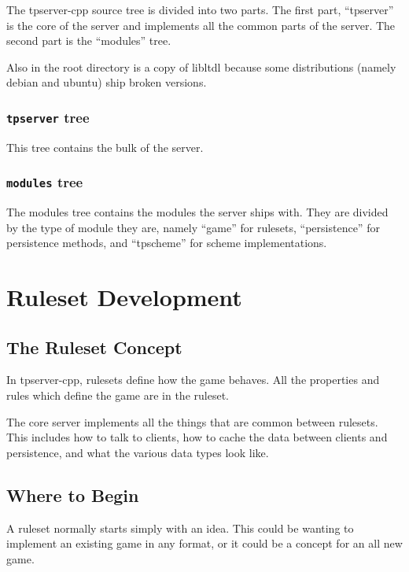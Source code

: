 \documentclass[a4paper,11pt]{report}
\begin{document}
The tpserver-cpp source tree is divided into two parts. The first part, ``tpserver'' is the core of the server and implements all the common parts of the server. The second part is the ``modules'' tree.

Also in the root directory is a copy of libltdl because some distributions (namely debian and ubuntu) ship broken versions.

\section{\texttt{tpserver} tree}
\label{sec:tree-tpserver}

This tree contains the bulk of the server.

\section{\texttt{modules} tree}
\label{sec:tree-modules}

The modules tree contains the modules the server ships with. They are divided by the type of module they are, namely ``game'' for rulesets, ``persistence'' for persistence methods, and ``tpscheme'' for scheme implementations.

\part{Ruleset Development}
\label{part:ruleset-dev}

\chapter{The Ruleset Concept}
\label{chap:ruleset-concept}

In tpserver-cpp, rulesets define how the game behaves.  All the properties and rules which define the game are in the ruleset.

The core server implements all the things that are common between rulesets. This includes how to talk to clients, how to cache the data between clients and persistence, and what the various data types look like.

\chapter{Where to Begin}
\label{chap:begin}

A ruleset normally starts simply with an idea. This could be wanting to implement an existing game in any format, or it could be a concept for an all new game.
\end{document}
